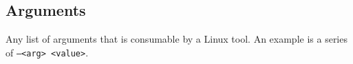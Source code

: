 \subsection{Arguments}
\label{arguments}

Any list of arguments that is consumable by a Linux tool. An example is a series of \texttt{--<arg> <value>}.